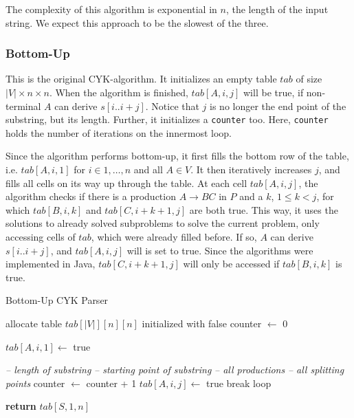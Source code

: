 The complexity of this algorithm is exponential in $n$, the length of the input string.
We expect this approach to be the slowest of the three.


\subsubsection{Bottom-Up}
This is the original CYK-algorithm.
It initializes an empty table $tab$ of size $|V|\times n\times n$.
When the algorithm is finished, $tab[A,i,j]$ will be true, if non-terminal $A$ can derive $s[i..i+j]$.
Notice that $j$ is no longer the end point of the substring, but its length.
Further, it initializes a \texttt{counter} too.
Here, \texttt{counter} holds the number of iterations on the innermost loop.

Since the algorithm performs bottom-up, it first fills the bottom row of the table, i.e. $tab[A,i,1]$ for $i\in{1,\dots,n}$ and all $A\in V$.
It then iteratively increases $j$, and fills all cells on its way up through the table.
At each cell $tab[A,i,j]$, the algorithm checks if there is a production $A\rightarrow BC$ in $P$ and a $k$, $1 \leq k < j$, for which $tab[B,i,k]$ and $tab[C,i+k+1, j]$ are both true.
This way, it uses the solutions to already solved subproblems to solve the current problem, only accessing cells of $tab$, which were already filled before.
If so, $A$ can derive $s[i..i+j]$, and $tab[A,i,j]$ will is set to true.
Since the algorithms were implemented in Java, $tab[C,i+k+1, j]$ will only be accessed if $tab[B,i,k]$ is true.


\begin{algorithm}[H]
    \caption{Bottom-Up CYK Parser}
    \label{alg:bu}
    \begin{algorithmic}[1]
        \State allocate table $tab[|V|][n][n]$ initialized with false
        \State counter $\leftarrow$ 0
    
                \State $tab[A,i,1] \leftarrow$ true
            \EndFor
        \EndFor

         \hspace*{2.75cm}\textit{-- length of substring}
             \hspace*{1cm}\textit{-- starting point of substring}
                 \hspace*{1cm}\textit{-- all productions}
                     \hspace*{0.5cm}\textit{-- all splitting points}
                        \State counter $\leftarrow$ counter + 1
                            \State $tab[A,i,j]\leftarrow$ true
                            \State break loop
                        \EndIf
                    \EndFor
                \EndFor
            \EndFor
        \EndFor

        \State \textbf{return} $tab[S,1,n]$
        \EndFunction
    \end{algorithmic}
\end{algorithm}

